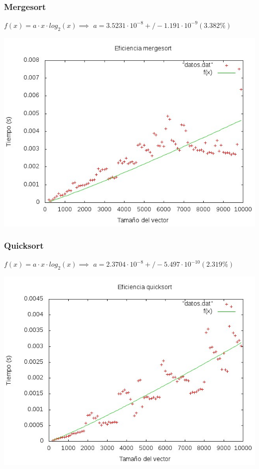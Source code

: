 \documentclass[11pt,spanish]{article} %
\begin{document}
{\ }

\subsubsection{Mergesort}
$ f(x) = a\cdot x\cdot log_2(x) \implies$
$ a               = 3.5231\cdot 10^{-8}       +/- 1.191\cdot 10^{-9}    (3.382\%) $
\begin{center}
\includegraphics[scale=0.55]{../Graficas/Mergesort/mergesortO0_ruben.jpeg}
\end{center}
\newpage

\subsubsection{Quicksort}
$ f(x) = a\cdot x\cdot log_2(x) \implies$
$ a               = 2.3704\cdot 10^{-8}       +/- 5.497\cdot 10^{-10}    (2.319\%) $
\begin{center}
\includegraphics[scale=0.55]{../Graficas/Quicksort/quicksortO0_ruben.jpeg}
\end{center}
\end{document}
